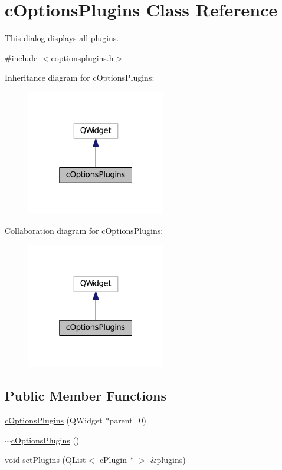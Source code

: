 \hypertarget{classc_options_plugins}{}\section{c\+Options\+Plugins Class Reference}
\label{classc_options_plugins}


This dialog displays all plugins.  




{\ttfamily \#include $<$coptionsplugins.\+h$>$}



Inheritance diagram for c\+Options\+Plugins\+:
\nopagebreak
\begin{figure}[H]
\begin{center}
\leavevmode
\includegraphics[width=172pt]{classc_options_plugins__inherit__graph}
\end{center}
\end{figure}


Collaboration diagram for c\+Options\+Plugins\+:
\nopagebreak
\begin{figure}[H]
\begin{center}
\leavevmode
\includegraphics[width=172pt]{classc_options_plugins__coll__graph}
\end{center}
\end{figure}
\subsection*{Public Member Functions}
\begin{DoxyCompactItemize}
\item 
\hyperlink{classc_options_plugins_a6742f672003c2b9255964f908a6981f2}{c\+Options\+Plugins} (Q\+Widget $\ast$parent=0)
\item 
\hyperlink{classc_options_plugins_a4360b27b58c0d10739c6c3bda1c02971}{$\sim$c\+Options\+Plugins} ()
\item 
void \hyperlink{classc_options_plugins_ab6ef94ac452b34fad3bfc8b3a2362c53}{set\+Plugins} (Q\+List$<$ \hyperlink{classc_plugin}{c\+Plugin} $\ast$ $>$ \&plugins)
\end{DoxyCompactItemize}
